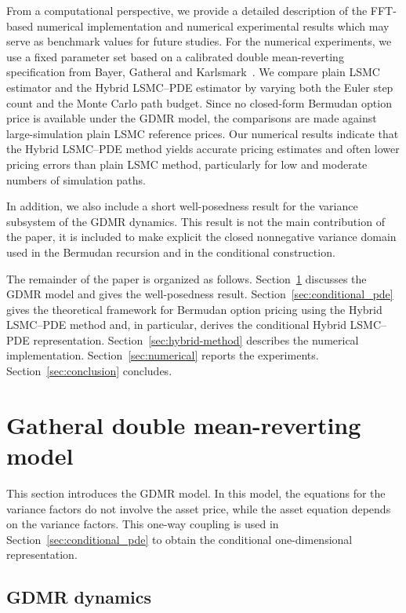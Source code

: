 \documentclass[pdflatex,sn-mathphys-num]{sn-jnl}
\theoremstyle{thmstyleone}%
\theoremstyle{thmstylethree}%
\theoremstyle{thmstyletwo}%
\begin{document}
From a computational perspective, we provide a detailed description of the FFT-based numerical implementation and numerical experimental results which may serve as benchmark values for future studies. For the numerical experiments, we use a fixed parameter set based on a calibrated double mean-reverting specification from
Bayer, Gatheral and Karlsmark~\citep{bayer2013fast}. We compare plain LSMC estimator and the Hybrid LSMC--PDE estimator by varying both the Euler step count and the Monte Carlo path budget. Since no closed-form Bermudan option price is available under the GDMR model, the comparisons are made against large-simulation plain LSMC reference prices. Our numerical results indicate that the Hybrid LSMC–PDE method yields accurate pricing estimates and often lower pricing errors than plain LSMC method, particularly for low and moderate numbers of simulation paths.

In addition, we also include a short well-posedness result for the variance subsystem of the GDMR dynamics. This result is not the main contribution of the paper, it is included to make explicit the closed nonnegative variance domain used in the Bermudan recursion and in the conditional construction.








The remainder of the paper is organized as follows. Section~\ref{sec:model}
discusses the GDMR model and gives the
well-posedness result. Section~\ref{sec:conditional_pde} gives the theoretical framework for Bermudan option pricing using the Hybrid LSMC--PDE method and, in particular, derives the
conditional Hybrid LSMC--PDE representation. Section~\ref{sec:hybrid-method} describes
the numerical implementation. Section~\ref{sec:numerical} reports the
experiments. Section~\ref{sec:conclusion} concludes.


\section{Gatheral double mean-reverting model}\label{sec:model}

This section introduces the GDMR model. In this model, the equations for the variance factors do not involve the asset price, while
the asset equation depends on the variance factors. This one-way coupling is
used in Section~\ref{sec:conditional_pde} to obtain the conditional
one-dimensional representation.

\subsection{GDMR dynamics}
\end{document}
